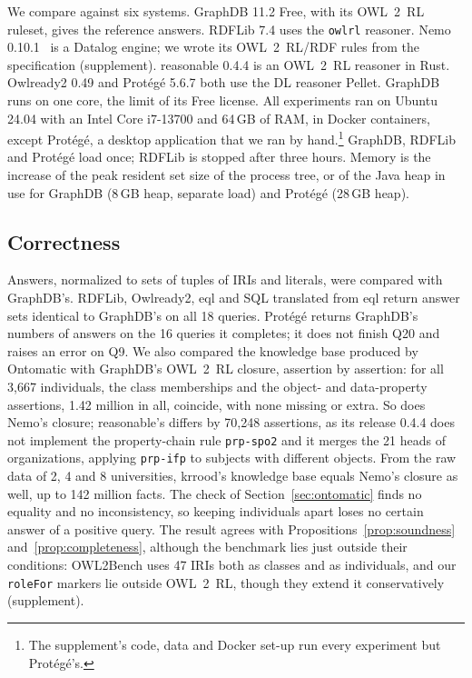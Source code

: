 \documentclass[sigconf,anonymous]{aamas}
\begin{document}
We compare against six systems. GraphDB 11.2 Free, with its OWL~2~RL ruleset, gives the reference answers. RDFLib 7.4 uses the \texttt{owlrl} reasoner. Nemo 0.10.1~\cite{ivliev2024nemo} is a Datalog engine; we wrote its OWL~2~RL/RDF rules from the specification (supplement). reasonable 0.4.4 is an OWL~2~RL reasoner in Rust. Owlready2 0.49 and Protégé 5.6.7 both use the DL reasoner Pellet. GraphDB runs on one core, the limit of its Free license. All experiments ran on Ubuntu 24.04 with an Intel Core i7-13700 and 64\,GB of RAM, in Docker containers, except Protégé, a desktop application that we ran by hand.\footnote{The supplement's code, data and Docker set-up run every experiment but Protégé's.} GraphDB, RDFLib and Protégé load once; RDFLib is stopped after three hours. Memory is the increase of the peak resident set size of the process tree, or of the Java heap in use for GraphDB (8\,GB heap, separate load) and Protégé (28\,GB heap).

\subsection{Correctness}
\label{ssec:correctness}

Answers, normalized to sets of tuples of IRIs and literals, were compared with GraphDB's. RDFLib, Owlready2, \ac{eql} and SQL translated from \ac{eql} return answer sets identical to GraphDB's on all 18 queries. Protégé returns GraphDB's numbers of answers on the 16 queries it completes; it does not finish Q20 and raises an error on Q9. We also compared the knowledge base produced by Ontomatic with GraphDB's OWL~2~RL closure, assertion by assertion: for all 3,667 individuals, the class memberships and the object- and data-property assertions, 1.42 million in all, coincide, with none missing or extra. So does Nemo's closure; reasonable's differs by 70,248 assertions, as its release 0.4.4 does not implement the property-chain rule \texttt{prp-spo2} and it merges the 21 heads of organizations, applying \texttt{prp-ifp} to subjects with different objects. From the raw data of 2, 4 and 8 universities, \ac{krrood}'s knowledge base equals Nemo's closure as well, up to 142 million facts. The check of Section~\ref{sec:ontomatic} finds no equality and no inconsistency, so keeping individuals apart loses no certain answer of a positive query. The result agrees with Propositions~\ref{prop:soundness} and~\ref{prop:completeness}, although the benchmark lies just outside their conditions: OWL2Bench uses 47 IRIs both as classes and as individuals, and our \texttt{roleFor} markers lie outside OWL~2~RL, though they extend it conservatively (supplement).
\end{document}

